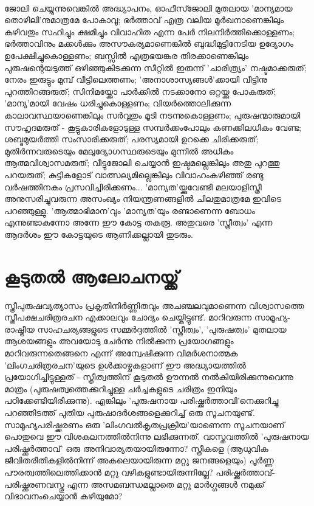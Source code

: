 \paragraph{}ജോലി ചെയ്യുന്നുവെങ്കിൽ അദ്ധ്യാപനം, ഓഫീസ്ജോലി മുതലായ 'മാന്യമായ തൊഴിലി'നുമാത്രമേ പോകാവൂ; ഭർത്താവ് എത്ര വലിയ മൂർഖനാണെങ്കിലും കഴിവതും സഹിച്ചും ക്ഷമിച്ചും വിവാഹിത എന്ന പേർ നിലനിർത്തിക്കൊള്ളണം; ഭർത്താവിനും മക്കൾക്കും അസൗകര്യമാണെങ്കിൽ ബുദ്ധിമുട്ടിനേടിയ ഉദ്യോഗം ഉപേക്ഷിച്ചുകൊള്ളണം; ബസ്സിൽ എത്രഭയങ്കര തിരക്കാണെങ്കിലും പുരുഷന്റെയടുത്ത് ഒഴിഞ്ഞുകിടക്കുന്ന സീറ്റിൽ ഇരുന്ന് 'ചാരിത്ര്യം' നഷ്ടമാക്കരുത്; നേരം ഇരുട്ടും മുമ്പ് വീട്ടിലെത്തണം; 'അനാശാസ്യങ്ങൾ'ക്കായി വീട്ടിനു പുറത്തിറങ്ങരുത്; സിനിമയ്ക്കോ പാർക്കിൽ നടക്കാനോ ഒറ്റയ്ക്കു പോകരുത്; 'മാന്യ'മായി വേഷം ധരിച്ചുകൊള്ളണം; വിയർത്തൊലിക്കുന്ന കാലാവസ്ഥയാണെങ്കിലും സർവ്വതും മൂടി നടന്നുകൊള്ളണം; പുരുഷന്മാരുമായി സൗഹൃദമരുത് - കൂട്ടുകാരികളോടുള്ള സമ്പർക്കംപോലും കണക്കിലധികം വേണ്ട; ശബ്ദമുയർത്തി സംസാരിക്കരുത്; പരസ്യമായി ഉറക്കെ ചിരിക്കരുത്; മുതിർന്നവരുടെയും മേലുദ്യോഗസ്ഥരുടെയും മുന്നിൽ അധികം ആത്മവിശ്വാസമരുത്; വീട്ടുജോലി ചെയ്യാൻ ഇഷ്ടമല്ലെങ്കിലും അതു പുറത്തു പറയരുത്; കുട്ടികളോട് വാത്സല്യമില്ലെങ്കിലും വിവാഹംകഴിഞ്ഞ് രണ്ടു വർഷത്തിനകം പ്രസവിച്ചിരിക്കണം... 'മാന്യത'യ്ക്കുവേണ്ടി മലയാളിസ്ത്രീ അനുസരിച്ചുവരുന്ന അസംഖ്യം നിയന്ത്രണങ്ങളിൽ ചിലതുമാത്രമേ ഇവിടെ പറഞ്ഞുള്ളു. 'ആത്മാഭിമാന'വും 'മാന്യത'യും രണ്ടാണെന്ന ബോധം എന്നുണ്ടാകുന്നോ അന്നേ ഈ കോട്ട തകരൂ. അതുവരെ 'സ്ത്രീത്വം' എന്ന ആദർശം ഈ കോട്ടയുടെ ആണിക്കല്ലായി തുടരും.

\section{കൂടുതൽ ആലോചനയ്ക്ക്}

സ്ത്രീപുരുഷവ്യത്യാസം പ്രകൃതിനിർണ്ണിതവും അചഞ്ചലവുമാണെന്ന വിശ്വാസത്തെ സ്ത്രീപക്ഷചരിത്രരചന എക്കാലവും ചോദ്യം ചെയ്തിട്ടുണ്ട്. മാറിവരുന്ന സാമൂഹ്യ-രാഷ്ട്രീയ സാഹചര്യങ്ങളുടെ സമ്മർദ്ദത്തിൽ 'സ്ത്രീത്വം', 'പുരുഷത്വം' മുതലായ ആശയങ്ങളും അവയോടു ചേർന്നു നിൽക്കുന്ന പ്രയോഗങ്ങളും മാറിവരുന്നതെങ്ങനെ എന്ന് അന്വേഷിക്കുന്ന വിമർശനാത്മക 'ലിംഗചരിത്രരചന'യുടെ ഉൾക്കാഴ്ചകളാണ് ഈ അദ്ധ്യായത്തിൽ പ്രയോഗിച്ചിട്ടുള്ളത് - സ്ത്രീത്വത്തിന് കൂടുതൽ ഊന്നൽ നൽകിയിരിക്കുന്നുവെന്നു മാത്രം (പുരുഷത്വത്തെക്കുറിച്ചുള്ള ചർച്ചകളുടെ ചരിത്രം ഇനിയും പഠിക്കേണ്ടിയിരിക്കുന്നു). എങ്കിലും 'പുരുഷനായ പരിഷ്ക്കർത്താവി'നെക്കുറിച്ചു പറഞ്ഞിടത്ത് പുതിയ പുരുഷാദർശങ്ങളെക്കുറിച്ച് ഒരു സൂചനയുണ്ട്. സാമൂഹ്യപരിഷ്ക്കരണം ഒരു 'ലിംഗവൽകൃതപ്രക്രിയ'യാണെന്ന സൂചനയാണ് പൊതുവെ ഈ വിശകലനത്തിൽനിന്നു ലഭിക്കുന്നത്. വാസ്തവത്തിൽ 'പുരുഷനായ പരിഷ്ക്കർത്താവ്' ഒരു അനിവാര്യതയായിരുന്നോ? സ്ത്രീകളെ (ആധുവിക ജീവിതരീതികളിൽനിന്ന് അകലെയായിരുന്ന മറ്റു ജനങ്ങളെയും) പൂർണ്ണ പൗരത്വത്തിലെത്തിക്കാൻ മറ്റു വഴികളുണ്ടായിരുന്നില്ലേ? പരിഷ്ക്കർത്താവ്-പരിഷ്ക്കരണവസ്തു എന്ന അസമബന്ധമല്ലാതെ മറ്റു മാർഗ്ഗങ്ങൾ നമുക്ക് വിഭാവനംചെയ്യാൻ കഴിയുമോ?

